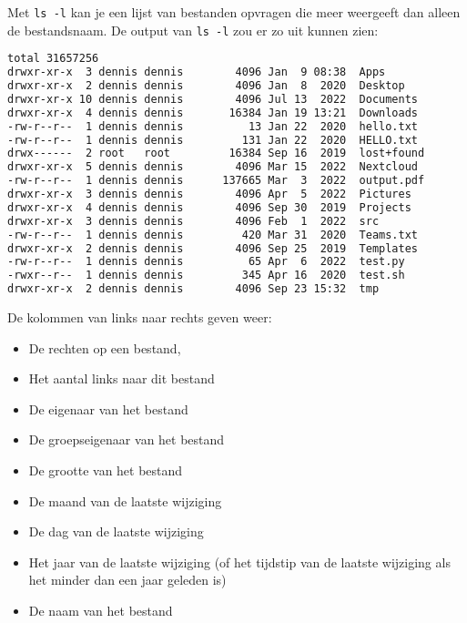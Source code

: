Met \texttt{ls -l} kan je een lijst van bestanden opvragen die meer weergeeft dan alleen de bestandsnaam. De output van \texttt{ls -l} zou er zo uit kunnen zien:
\begin{lstlisting}[language=bash]
total 31657256
drwxr-xr-x  3 dennis dennis        4096 Jan  9 08:38  Apps
drwxr-xr-x  2 dennis dennis        4096 Jan  8  2020  Desktop
drwxr-xr-x 10 dennis dennis        4096 Jul 13  2022  Documents
drwxr-xr-x  4 dennis dennis       16384 Jan 19 13:21  Downloads
-rw-r--r--  1 dennis dennis          13 Jan 22  2020  hello.txt
-rw-r--r--  1 dennis dennis         131 Jan 22  2020  HELLO.txt
drwx------  2 root   root         16384 Sep 16  2019  lost+found
drwxr-xr-x  5 dennis dennis        4096 Mar 15  2022  Nextcloud
-rw-r--r--  1 dennis dennis      137665 Mar  3  2022  output.pdf
drwxr-xr-x  3 dennis dennis        4096 Apr  5  2022  Pictures
drwxr-xr-x  4 dennis dennis        4096 Sep 30  2019  Projects
drwxr-xr-x  3 dennis dennis        4096 Feb  1  2022  src
-rw-r--r--  1 dennis dennis         420 Mar 31  2020  Teams.txt
drwxr-xr-x  2 dennis dennis        4096 Sep 25  2019  Templates
-rw-r--r--  1 dennis dennis          65 Apr  6  2022  test.py
-rwxr--r--  1 dennis dennis         345 Apr 16  2020  test.sh
drwxr-xr-x  2 dennis dennis        4096 Sep 23 15:32  tmp
\end{lstlisting}

De kolommen van links naar rechts geven weer:
\begin{itemize}
\item De rechten op een bestand,
\item Het aantal links naar dit bestand
\item De eigenaar van het bestand
\item De groepseigenaar van het bestand
\item De grootte van het bestand
\item De maand van de laatste wijziging
\item De dag van de laatste wijziging
\item Het jaar van de laatste wijziging (of het tijdstip van de laatste wijziging als het minder dan een jaar geleden is)
\item De naam van het bestand
\end{itemize}
